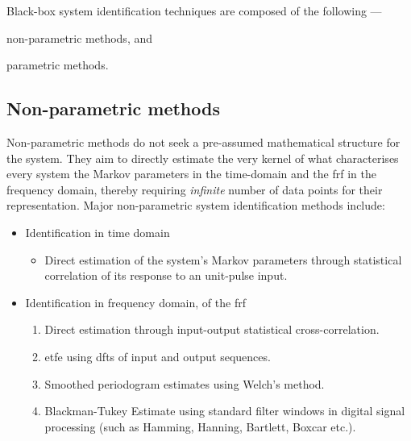 
Black-box system identification techniques are composed of the following ---
\begin{enumerate*}[label=\emph{\alph*})]
     \item non-parametric methods, and
     \item parametric methods.
 \end{enumerate*}

\subsection{Non-parametric methods}
Non-parametric methods do not seek  a pre-assumed mathematical structure for the
system. They  aim to  directly estimate  the very  kernel of  what characterises
every system \viz{}  the Markov parameters in the time-domain  and the \gls{frf}
in the frequency domain, thereby requiring \emph{infinite} number of data points
for  their representation.  Major non-parametric  system identification  methods
include:
\begin{itemize}[topsep=0pt]
    \item Identification in time domain
        \begin{itemize}

            \item Direct  estimation of the system's  Markov parameters through
                statistical correlation of its response to an unit-pulse input.

        \end{itemize}
    \item Identification in frequency domain,  \ie{} of the \gls{frf}
        \begin{enumerate}

            \item   Direct   estimation    through   input-output   statistical
                cross-correlation.

            \item  \gls{etfe} using \glspl{dft} of input and output sequences.

            \item  Smoothed periodogram estimates using Welch's method.

            \item  Blackman-Tukey  Estimate   using  standard  filter
                windows  in digital  signal processing  (such as  Hamming, Hanning,
                Bartlett, Boxcar etc.).

        \end{enumerate}
\end{itemize}

